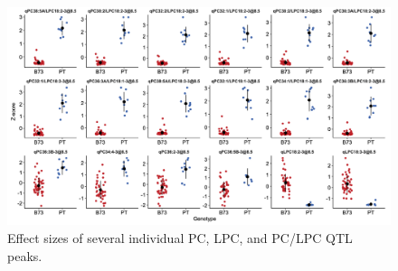 \documentclass[9pt,twocolumn,twoside,lineno]{BioRxiv}
\begin{document}
\clearpage

\begin{figure}[t]
\begin{center}
\includegraphics[width=0.9\paperwidth]{Sup_Figures/Sup_Fig_2.png}
\caption{Effect sizes of several individual PC, LPC, and PC/LPC QTL peaks. 
}
\label{SupFig2}
\end{center}
\end{figure} 

\clearpage
\end{document}
